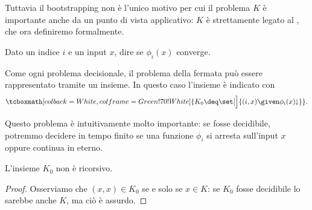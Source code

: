 \bigskip
\bigskip

Tuttavia il bootstrapping non è l'unico motivo per cui il problema $K$ è importante anche da un punto di vista applicativo: $K$ è strettamente legato al , che ora definiremo formalmente.

\begin{definition}
    Dato un indice $i$ e un input $x$, dire se $\phi_i(x)$ converge.   
\end{definition}

Come ogni problema decisionale, il problema della fermata può essere rappresentato tramite un insieme. In questo caso l'insieme è indicato con \[
    \tcboxmath[colback=White, colframe=Green!70!White]{K_0 \deq \set[\Big]{(i, x) \given \phi_i(x)\conv}}. 
\]

Questo problema è intuitivamente molto importante: se fosse decidibile, potremmo decidere in tempo finito se una funzione $\phi_i$ si arresta sull'input $x$ oppure continua in eterno.

\begin{theorem}
    L'insieme $K_0$ non è ricorsivo.
\end{theorem}
\begin{proof}
    Osserviamo che $(x, x) \in K_0$ se e solo se $x \in K$: se $K_0$ fosse decidibile lo sarebbe anche $K$, ma ciò è assurdo.    
\end{proof}